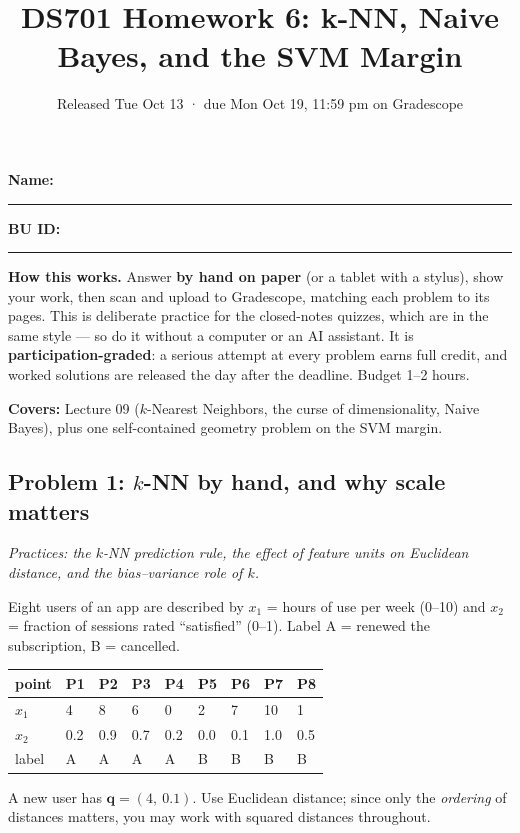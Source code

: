 \documentclass[
  11pt,
]{article}
\title{DS701 Homework 6: k-NN, Naive Bayes, and the SVM Margin}
\subtitle{Released Tue Oct 13 · due Mon Oct 19, 11:59 pm on Gradescope}
\author{}
\date{}
\newcounter{none} %
\begin{document}
\maketitle


\noindent\textbf{Name:}\ \rule{2.0in}{0.4pt}\qquad\textbf{BU ID:}\ \rule{1.2in}{0.4pt}
\vspace{6pt}

\textbf{How this works.} Answer \textbf{by hand on paper} (or a tablet
with a stylus), show your work, then scan and upload to Gradescope,
matching each problem to its pages. This is deliberate practice for the
closed-notes quizzes, which are in the same style --- so do it without a
computer or an AI assistant. It is \textbf{participation-graded}: a
serious attempt at every problem earns full credit, and worked solutions
are released the day after the deadline. Budget 1--2 hours.

\textbf{Covers:} Lecture 09 (\(k\)-Nearest Neighbors, the curse of
dimensionality, Naive Bayes), plus one self-contained geometry problem
on the SVM margin.

\subsection{\texorpdfstring{Problem 1: \(k\)-NN by hand, and why scale
matters}{Problem 1: k-NN by hand, and why scale matters}}\label{problem-1-k-nn-by-hand-and-why-scale-matters}

\emph{Practices: the \(k\)-NN prediction rule, the effect of feature
units on Euclidean distance, and the bias--variance role of \(k\).}

Eight users of an app are described by \(x_1\) = hours of use per week
(0--10) and \(x_2\) = fraction of sessions rated ``satisfied'' (0--1).
Label A = renewed the subscription, B = cancelled.

{\def\LTcaptype{none} %
\begin{longtable}[]{@{}lllllllll@{}}
\toprule\noalign{}
point & P1 & P2 & P3 & P4 & P5 & P6 & P7 & P8 \\
\midrule\noalign{}
\endhead
\bottomrule\noalign{}
\endlastfoot
\(x_1\) & 4 & 8 & 6 & 0 & 2 & 7 & 10 & 1 \\
\(x_2\) & 0.2 & 0.9 & 0.7 & 0.2 & 0.0 & 0.1 & 1.0 & 0.5 \\
label & A & A & A & A & B & B & B & B \\
\end{longtable}
}

A new user has \(\mathbf{q} = (4,\ 0.1)\). Use Euclidean distance; since
only the \emph{ordering} of distances matters, you may work with squared
distances throughout.
\end{document}
